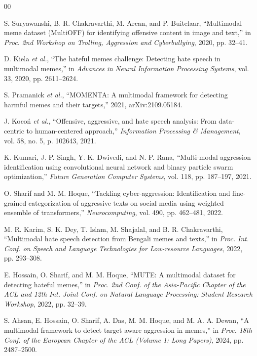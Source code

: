 \documentclass[conference]{IEEEtran}
\begin{document}
\begin{thebibliography}{00}

 S. Suryawanshi, B. R. Chakravarthi, M. Arcan, and P. Buitelaar, ``Multimodal meme dataset (MultiOFF) for identifying offensive content in image and text,'' in \textit{Proc. 2nd Workshop on Trolling, Aggression and Cyberbullying}, 2020, pp. 32--41.

 D. Kiela \textit{et al.}, ``The hateful memes challenge: Detecting hate speech in multimodal memes,'' in \textit{Advances in Neural Information Processing Systems}, vol. 33, 2020, pp. 2611--2624.

 S. Pramanick \textit{et al.}, ``MOMENTA: A multimodal framework for detecting harmful memes and their targets,'' 2021, arXiv:2109.05184.

 J. Koco\'{n} \textit{et al.}, ``Offensive, aggressive, and hate speech analysis: From data-centric to human-centered approach,'' \textit{Information Processing \& Management}, vol. 58, no. 5, p. 102643, 2021.

 K. Kumari, J. P. Singh, Y. K. Dwivedi, and N. P. Rana, ``Multi-modal aggression identification using convolutional neural network and binary particle swarm optimization,'' \textit{Future Generation Computer Systems}, vol. 118, pp. 187--197, 2021.

 O. Sharif and M. M. Hoque, ``Tackling cyber-aggression: Identification and fine-grained categorization of aggressive texts on social media using weighted ensemble of transformers,'' \textit{Neurocomputing}, vol. 490, pp. 462--481, 2022.

 M. R. Karim, S. K. Dey, T. Islam, M. Shajalal, and B. R. Chakravarthi, ``Multimodal hate speech detection from Bengali memes and texts,'' in \textit{Proc. Int. Conf. on Speech and Language Technologies for Low-resource Languages}, 2022, pp. 293--308.

 E. Hossain, O. Sharif, and M. M. Hoque, ``MUTE: A multimodal dataset for detecting hateful memes,'' in \textit{Proc. 2nd Conf. of the Asia-Pacific Chapter of the ACL and 12th Int. Joint Conf. on Natural Language Processing: Student Research Workshop}, 2022, pp. 32--39.

 S. Ahsan, E. Hossain, O. Sharif, A. Das, M. M. Hoque, and M. A. A. Dewan, ``A multimodal framework to detect target aware aggression in memes,'' in \textit{Proc. 18th Conf. of the European Chapter of the ACL (Volume 1: Long Papers)}, 2024, pp. 2487--2500.


\end{thebibliography}
\end{document}
